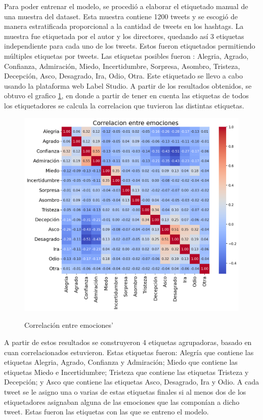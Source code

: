 Para poder entrenar el modelo, se procedió a elaborar el etiquetado manual de una muestra del dataset. Esta muestra contiene 1200 tweets y se escogió de manera estratificada proporcional a la cantidad de tweets en los hashtags. La muestra fue etiquetada por el autor y los directores, quedando así 3 etiquetas independiente para cada uno de los tweets. Estos fueron etiquetados permitiendo múltiples etiquetas por tweets. Las etiquetas posibles fueron : Alegria, Agrado, Confianza, Admiración, Miedo, Incertidumbre, Sorpresa, Asombro, Tristeza, Decepción, Asco, Desagrado, Ira, Odio, Otra. Este etiquetado se llevo a cabo usando la plataforma web Label Studio. A partir de los resultados obtenidos, se obtuvo el grafico \ref{figure:correlacion_emociones}, en donde a partir de tener en cuenta las etiquetas de todos los etiquetadores se calcula la correlacion que tuvieron las distintas etiquetas. 

\begin{figure}[h]
	\caption{Correlación entre emociones'}
	\centering
	\includegraphics[scale=0.65]{../Images/EDA/emotions_correlations.png} 
	\label{figure:correlacion_emociones}
\end{figure}


A partir de estos resultados se construyeron 4 etiquetas agrupadoras, basado en cuan correlacionados estuvieron. Estas etiquetas fueron: Alegría que contiene las etiquetas Alegria, Agrado, Confianza y Admiración; Miedo que contiene las etiquetas Miedo e  Incertidumbre; Tristeza que contiene las etiquetas Tristeza y  Decepción; y 
Asco que contiene las etiquetas Asco, Desagrado, Ira y Odio. A cada tweet se le asigno una o varias de estas etiquetas finales si al menos dos de los etiquetadores asignaban alguna de las emociones que las componían a dicho tweet. Estas fueron las etiquetas con las que se entreno el modelo.

